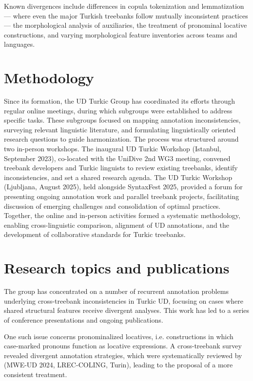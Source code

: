 \documentclass[11pt,a4paper]{article}
\begin{document}
Known divergences include differences in copula tokenization and lemmatization --- where even the major Turkish treebanks follow mutually inconsistent practices --- the morphological analysis of auxiliaries, the treatment of pronominal locative constructions, and varying morphological feature inventories across teams and languages.

\section{Methodology}
Since its formation, the UD Turkic Group has coordinated its efforts through regular online meetings, during which subgroups were established to address specific tasks. These subgroups focused on mapping annotation inconsistencies, surveying relevant linguistic literature, and formulating linguistically oriented research questions to guide harmonization. The process was structured around two in-person workshops. The inaugural UD Turkic Workshop (Istanbul, September 2023), co-located with the UniDive 2nd WG3 meeting, convened treebank developers and Turkic linguists to review existing treebanks, identify inconsistencies, and set a shared research agenda. The UD Turkic Workshop (Ljubljana, August 2025), held alongside SyntaxFest 2025, provided a forum for presenting ongoing annotation work and parallel treebank projects, facilitating discussion of emerging challenges and consolidation of optimal practices. Together, the online and in-person activities formed a systematic methodology, enabling cross-linguistic comparison, alignment of UD annotations, and the development of collaborative standards for Turkic treebanks.

\section{Research topics and publications}
The group has concentrated on a number of recurrent annotation problems underlying cross-treebank inconsistencies in Turkic UD, focusing on cases where shared structural features receive divergent analyses. This work has led to a series of conference presentations and ongoing publications.

One such issue concerns pronominalized locatives, i.e. constructions in which case-marked pronouns function as locative expressions. A cross-treebank survey revealed divergent annotation strategies, which were systematically reviewed by \citet{washingtonStrategiesAnnotationPronominalised2024} (MWE-UD 2024, LREC-COLING, Turin), leading to the proposal of a more consistent treatment.
\end{document}
